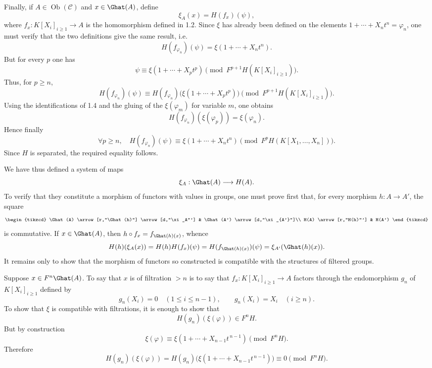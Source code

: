 \documentclass[11pt]{article}
\begin{document}
Finally, if \(A\in\operatorname{Ob}(\mathcal C)\) and \(x\in\Ghat(A)\), define
\[
  \xi_A(x)=H(f_x)(\psi),
\]
where \(f_x:K[X_i]_{i\geq 1}\to A\) is the homomorphism defined in 1.2. Since \(\xi\) has already been defined on the elements \(1+\cdots+X_nt^n=\varphi_n\), one must verify that the two definitions give the same result, i.e.
\[
  H(f_{\varphi_n})(\psi)=\xi(1+\cdots+X_nt^n).
\]
But for every \(p\) one has
\[
  \psi\equiv \xi(1+\cdots+X_pt^p)
  \pmod{F^{p+1}H(K[X_i]_{i\geq 1})}.
\]
Thus, for \(p\geq n\),
\[
  H(f_{\varphi_n})(\psi)
  \equiv
  H(f_{\varphi_n})\bigl(\xi(1+\cdots+X_pt^p)\bigr)
  \pmod{F^{p+1}H(K[X_i]_{i\geq 1})}.
\]
Using the identifications of 1.4 and the gluing of the \(\xi(\varphi_m)\) for variable \(m\), one obtains
\[
  H(f_{\varphi_n})(\xi(\varphi_p))=\xi(\varphi_n).
\]
Hence finally
\[
  \forall p\geq n,\quad
  H(f_{\varphi_n})(\psi)\equiv \xi(1+\cdots+X_nt^n)
  \pmod{F^pH(K[X_1,\ldots,X_n])}.
\]
Since \(H\) is separated, the required equality follows.

We have thus defined a system of maps
\[
  \xi_A:\Ghat(A)\longrightarrow H(A).
\]
To verify that they constitute a morphism of functors with values in groups, one must prove first that, for every morphism \(h:A\to A'\), the square
\[
\begin{tikzcd}
\Ghat(A) \arrow[r,"\Ghat(h)"] \arrow[d,"\xi_A"'] &
\Ghat(A') \arrow[d,"\xi_{A'}"]\\
H(A) \arrow[r,"H(h)"'] & H(A')
\end{tikzcd}
\]
is commutative. If \(x\in\Ghat(A)\), then \(h\circ f_x=f_{\Ghat(h)(x)}\), whence
\[
  H(h)(\xi_A(x))=H(h)H(f_x)(\psi)
  =H(f_{\Ghat(h)(x)})(\psi)=\xi_{A'}(\Ghat(h)(x)).
\]
It remains only to show that the morphism of functors so constructed is compatible with the structures of filtered groups.

Suppose \(x\in F^n\Ghat(A)\). To say that \(x\) is of filtration \(>n\) is to say that
\(f_x:K[X_i]_{i\geq 1}\to A\) factors through the endomorphism \(g_n\) of \(K[X_i]_{i\geq 1}\) defined by
\[
  g_n(X_i)=0\quad (1\leq i\leq n-1),\qquad
  g_n(X_i)=X_i\quad (i\geq n).
\]
To show that \(\xi\) is compatible with filtrations, it is enough to show that
\[
  H(g_n)(\xi(\varphi))\in F^nH.
\]
But by construction
\[
  \xi(\varphi)\equiv \xi(1+\cdots+X_{n-1}t^{\,n-1})
  \pmod{F^nH}.
\]
Therefore
\[
  H(g_n)(\xi(\varphi))
  =H(g_n)\bigl(\xi(1+\cdots+X_{n-1}t^{\,n-1})\bigr)
  \equiv 0\pmod{F^nH}.
\]
\end{document}
